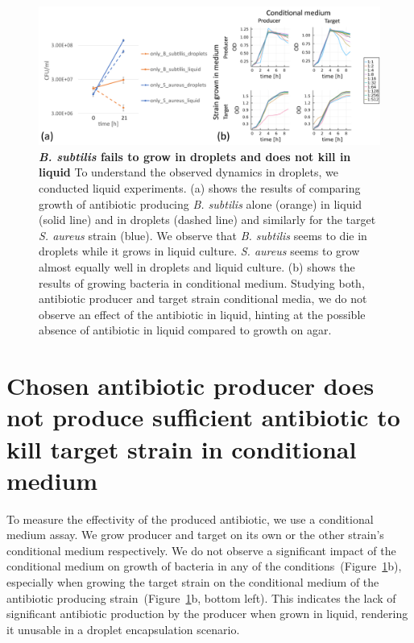 \begin{figure}
\centering
\includegraphics[width=\linewidth]{graphics/2025_09_30_droplets_fig9.png}
\caption{\textbf{\textit{B. subtilis} fails to grow in droplets and does not kill in liquid} To understand the observed dynamics in droplets, we conducted liquid experiments. (a) shows the results of comparing growth of antibiotic producing \textit{B. subtilis} alone (orange) in liquid (solid line) and in droplets (dashed line) and similarly for the target \textit{S. aureus} strain (blue). We observe that \textit{B. subtilis} seems to die in droplets while it grows in liquid culture. \textit{S. aureus} seems to grow almost equally well in droplets and liquid culture. (b) shows the results of growing bacteria in conditional medium. Studying both, antibiotic producer and target strain conditional media, we do not observe an effect of the antibiotic in liquid, hinting at the possible absence of antibiotic in liquid compared to growth on agar.}
\label{fig:results_liquid_vs_drop_supernatant}
\end{figure}

\section{Chosen antibiotic producer does not produce sufficient antibiotic to kill target strain in conditional medium}
To measure the effectivity of the produced antibiotic, we use a conditional medium assay. We grow producer and target on its own or the other strain's conditional medium respectively. We do not observe a significant impact of the conditional medium on growth of bacteria in any of the conditions~(Figure~\ref{fig:results_liquid_vs_drop_supernatant}b), especially when growing the target strain on the conditional medium of the antibiotic producing strain~(Figure~\ref{fig:results_liquid_vs_drop_supernatant}b, bottom left). This indicates the lack of significant antibiotic production by the producer when grown in liquid, rendering it unusable in a droplet encapsulation scenario.